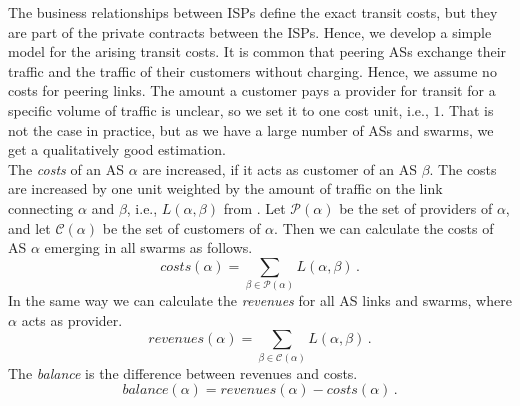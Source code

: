 The business relationships between ISPs define the exact transit costs, but they are part of the private contracts between the ISPs. Hence, we develop a simple model for the arising transit costs. It is common that peering ASs exchange their traffic and the traffic of their customers without charging. Hence, we assume no costs for peering links. The amount a customer pays a provider for transit for a specific volume of traffic is unclear, so we set it to one cost unit, i.e., $1$. That is not the case in practice, but as we have a large number of ASs and swarms, we get a qualitatively good estimation.\\
The \textit{costs} of an AS $\alpha$ are increased, if it acts as customer of an AS $\beta$. The costs are increased by one unit weighted by the amount of traffic on the link connecting $\alpha$ and $\beta$, i.e., $L(\alpha, \beta)$ from . Let $\mathcal P(\alpha)$ be the set of providers of $\alpha$, and let $\mathcal C(\alpha)$ be the set of customers of $\alpha$. Then we can calculate the costs of AS $\alpha$ emerging in all swarms as follows.
\begin{equation}\label{equ:costs}
costs(\alpha) = \sum_{\beta\in\mathcal P(\alpha)} L(\alpha,\beta) \, .
\end{equation}
In the same way we can calculate the \textit{revenues} for all AS links and swarms, where $\alpha$ acts as provider.
\begin{equation}\label{equ:revenues}
revenues(\alpha) = \sum_{\beta\in \mathcal C(\alpha)} L(\alpha,\beta) \, .
\end{equation}
The \textit{balance} is the difference between revenues and costs.
\begin{equation}\label{equ:balance}
balance(\alpha) = revenues(\alpha)-costs(\alpha) \, .
\end{equation}
